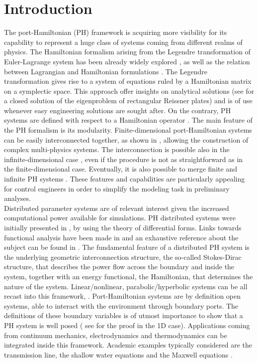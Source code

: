 \documentclass[preprint,12pt]{elsarticle}
\newcommand{\firstReviewer}[1]{\textcolor{red!80!black}{#1}}
\newcommand{\secondReviewer}[1]{\textcolor{blue!80!black}{#1}}
\begin{document}
	\section*{Introduction}
	 The port-Hamiltonian (PH) framework is acquiring more visibility for its capability to represent a huge class of systems coming from different realms of physics. The Hamiltonian formalism arising from the Legendre transformation of Euler-Lagrange system  has been already widely explored \cite{SymplecticElasticity}, \secondReviewer{as well as the relation between Lagrangian and Hamiltonian formulations \cite{MardsenDiraclAG_I, MardsenDiraclAG_II}.} The Legendre transformation gives rise to a system of equations ruled by a Hamiltonian matrix on a symplectic space. \firstReviewer{This approach offer insights on analytical solutions (see \cite{WeianMindlin} for a closed solution of the eigenproblem of rectangular Reissner plates) and is of use whenever easy engineering solutions are sought after.}   On the contrary, PH systems are defined with respect to a \secondReviewer{Hamiltonian operator \cite[Chapter~7]{Olver}.} The main feature of the PH formalism is its modularity. Finite-dimensional port-Hamiltonian systems can be easily interconnected together, as shown in \cite{Cervera2007}, allowing the construction of complex multi-physics systems. The interconnection is possible also in the infinite-dimensional case \cite{ShaftIntInfinite}, even if the procedure is not as straightforward as in the finite-dimensional case. Eventually, it is also possible to merge finite and infinite PH systems \cite{vanderShaftintFinInf}. These features and capabilities are particularly appealing for control engineers in order to simplify the modeling task in preliminary analyses.  \\
	
	
	Distributed parameter systems are of relevant interest given the increased computational power available for simulations. PH distributed systems were initially presented in \cite{VANDERSCHAFT2002166}, by using the theory of differential forms. Links towards functional analysis have been made in \cite{Villegas} and an exhaustive reference about the subject can be found in \cite{BookZwart}. The fundamental feature of a distributed PH system is the underlying geometric interconnection structure, the so-called Stokes-Dirac structure, that describes the power flow across the boundary and inside the system, together with an energy functional, the Hamiltonian, that determines the nature of the system. Linear/nonlinear, parabolic/hyperbolic systems can be all recast into this framework, \cite{bookPHs}. Port-Hamiltonian systems are by definition open systems, able to interact with the environment through boundary ports. The definitions of these boundary variables is of utmost importance to show that a PH system is well posed ( see \cite{LeGorrec2005} for the proof in the 1D case). Applications coming from continuum mechanics, electrodynamics and thermodynamics can be integrated inside this framework. Academic examples typically considered are the transmission line, the shallow water equations and the Maxwell equations \cite{VANDERSCHAFT2002166}. \\
	
\end{document}
